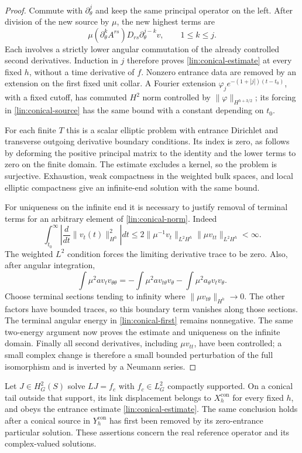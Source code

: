 \begin{proof}
Commute with $\partial_\theta^j$ and keep the same principal operator
on the left.  After division of the new source by $\mu$, the new
highest terms are
\[
 \mu(\partial_\theta^k A^{rs})
            D_{rs}\partial_\theta^{j-k}v,\qquad 1\le k\le j.
\]
Each involves a strictly lower angular commutation of the already
controlled second derivatives.  Induction in $j$ therefore proves
\eqref{lin:conical-estimate} at every fixed $h$, without a time
derivative of $f$.  Nonzero entrance data are removed by an extension
on the first fixed unit collar.  A Fourier extension
$\varphi_j e^{-(1+|j|)(t-t_0)}$, with a fixed cutoff, has commuted
$H^2$ norm controlled by $\|\varphi\|_{H^{h+3/2}}$; its forcing in
\eqref{lin:conical-source} has the same bound with a constant depending
on $t_0$.

For each finite $T$ this is a scalar elliptic problem with entrance
Dirichlet and transverse outgoing derivative boundary conditions.
Its index is zero, as follows by deforming the positive principal
matrix to the identity and the lower terms to zero on the finite
domain.  The estimate excludes a kernel, so the problem is surjective.
Exhaustion, weak compactness in the weighted bulk spaces, and local
elliptic compactness give an infinite-end solution with the same bound.

For uniqueness on the infinite end it is necessary to justify removal
of terminal terms for an arbitrary element of
\eqref{lin:conical-norm}.  Indeed
\[
 \int_{t_0}^\infty
   \left|\frac{d}{dt}\|v_t(t)\|_{H^h}^2\right|dt
 \le2\|\mu^{-1}v_t\|_{L^2H^h}\|\mu v_{tt}\|_{L^2H^h}<\infty.
\]
The weighted $L^2$ condition forces the limiting derivative trace to
be zero.  Also, after angular integration,
\[
 \int\mu^2a v_t v_{\theta\theta}
 =-\int\mu^2a v_{t\theta}v_\theta
       -\int\mu^2a_\theta v_tv_\theta.
\]
Choose terminal sections tending to infinity where
$\|\mu v_{t\theta}\|_{H^h}\to0$.  The other factors have bounded
traces, so this boundary term vanishes along those sections.  The
terminal angular energy in \eqref{lin:conical-first} remains
nonnegative.  The same two-energy argument now proves the estimate
and uniqueness on the infinite domain.  Finally all second derivatives,
including $\mu v_{tt}$, have been controlled; a small complex change
is therefore a small bounded perturbation of the full isomorphism and
is inverted by a Neumann series.
\end{proof}

\begin{lemma}\label{lin:gaussian-conical}
Let $J\in H^2_G(S)$ solve $LJ=f_c$ with $f_c\in L^2_G$ compactly
supported.  On a conical tail outside that support, its link displacement
belongs to $X^{\mathrm{con}}_h$ for every fixed $h$, and obeys the
entrance estimate \eqref{lin:conical-estimate}.  The same conclusion
holds after a conical source in $Y^{\mathrm{con}}_h$ has first been
removed by its zero-entrance particular solution.  These assertions
concern the real reference operator and its complex-valued solutions.
\end{lemma}

